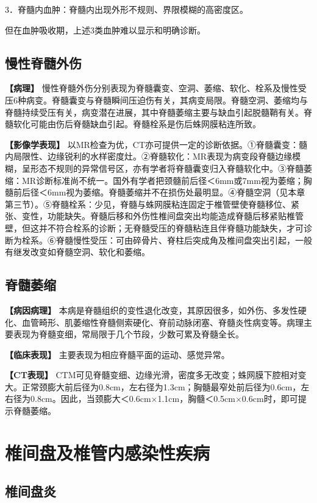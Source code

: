 3．脊髓内血肿：脊髓内出现外形不规则、界限模糊的高密度区。

但在血肿吸收期，上述3类血肿难以显示和明确诊断。

\subsection{慢性脊髓外伤}

\textbf{【病理】}
慢性脊髓外伤分别表现为脊髓囊变、空洞、萎缩、软化、栓系及慢性受压6种病变。脊髓囊变与脊髓瞬间压迫伤有关，其病变局限。脊髓空洞、萎缩均与脊髓持续受压有关，病变潜在进展，其中脊髓萎缩主要与缺血引起脱髓鞘有关。脊髓软化可能由伤后脊髓缺血引起。脊髓栓系是伤后蛛网膜粘连所致。

\textbf{【影像学表现】}
以MR检查为优，CT亦可提供一定的诊断依据。①脊髓囊变：髓内局限性、边缘锐利的水样密度灶。②脊髓软化：MR表现为病变段脊髓边缘模糊，呈形态不规则的异常信号区，亦有学者将脊髓囊变归入脊髓软化中。③脊髓萎缩：MR诊断标准尚不统一。国外有学者把颈髓前后径＜6mm或7mm视为萎缩；胸髓前后径＜6mm视为萎缩。脊髓萎缩并不在损伤处最明显。④脊髓空洞（见本章第三节）。⑤脊髓栓系：少见，脊髓与蛛网膜粘连固定于椎管壁使脊髓移位、紧张、变性，功能缺失。脊髓后移和外伤性椎间盘突出均能造成脊髓后移紧贴椎管壁，但这并不符合栓系的诊断；无脊髓受压的脊髓粘连且伴脊髓功能缺失，才可诊断为栓系。⑥脊髓慢性受压：可由碎骨片、脊柱后突成角及椎间盘突出引起，一般有继发改变如脊髓空洞、软化和萎缩。

\subsection{脊髓萎缩}

\textbf{【病因病理】}
本病是脊髓组织的变性退化改变，其原因很多，如外伤、多发性硬化、血管畸形、肌萎缩性脊髓侧索硬化、脊前动脉闭塞、脊髓炎性病变等。病理主要表现为脊髓变细，常局限于几个节段，少数可累及脊髓全长。

\textbf{【临床表现】} 主要表现为相应脊髓平面的运动、感觉异常。

\textbf{【CT表现】}
CTM可见脊髓变细、边缘光滑，密度多无改变；蛛网膜下腔相对变大。正常颈膨大前后径为0.8cm，左右径为1.3cm；胸髓最窄处前后径为0.6cm，左右径为0.8cm。因此，当颈膨大＜0.6cm×1.1cm，胸髓＜0.5cm×0.6cm时，即可提示脊髓萎缩。

\section{椎间盘及椎管内感染性疾病}

\subsection{椎间盘炎}


